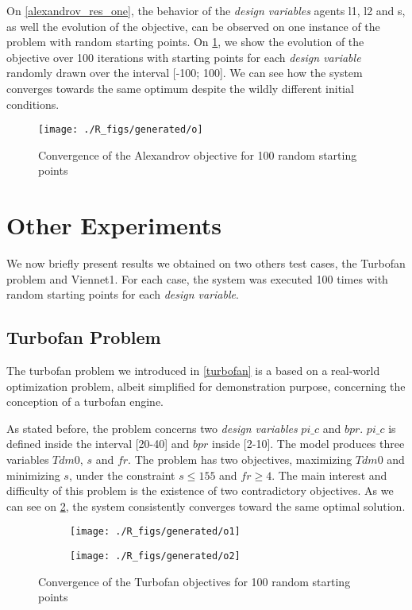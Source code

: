 On \figurename \ref{alexandrov_res_one}, the behavior of the \emph{design variables} agents l1, l2 and s, as well the evolution of the objective, can be observed on one instance of the problem with random starting points. On \figurename \ref{alexandrov_res}, we show the evolution of the objective over 100 iterations with  starting points  for each \emph{design variable} randomly drawn over the interval [-100; 100]. We can see how the system converges towards the same optimum despite the wildly different initial conditions.

\begin{figure}
\centering
    \texttt{[image: ./R\_figs/generated/o]}
	\caption{Convergence of the Alexandrov objective for 100 random starting points}
	\label{alexandrov_res}
\end{figure}

\section{Other Experiments}

We now briefly present results we obtained on two others test cases, the Turbofan problem and Viennet1. For each case, the system was executed 100 times with random starting points for each \emph{design variable}.

\subsection{Turbofan Problem}

The turbofan problem we introduced in \figurename \ref{turbofan} is a based on a real-world optimization problem, albeit simplified for demonstration purpose, concerning the conception of a turbofan engine.

As stated before, the problem concerns two \emph{design variables} $pi\_c$ and $bpr$. $pi\_c$ is defined inside the interval [20-40] and $bpr$ inside [2-10]. The model produces three variables $Tdm0$, $s$ and $fr$.
The problem has two objectives, maximizing  $Tdm0$ and minimizing $s$, under the constraint \(s \leq 155\) and \(fr \geq 4\).
The main interest and difficulty of this problem is the existence of two contradictory objectives.
As we can see on \figurename \ref{snecma_res}, the system consistently converges toward the same optimal solution.

\begin{figure}[h]
	\begin{subfigure}[b]{0.49\textwidth}
		\centering
		\texttt{[image: ./R\_figs/generated/o1]}	
	\end{subfigure}
	\hfill%
	\begin{subfigure}[b]{0.49\textwidth}
		\centering
		\texttt{[image: ./R\_figs/generated/o2]}	
	\end{subfigure}
	\caption{Convergence of the Turbofan objectives for 100 random starting points}
	\label{snecma_res}
\end{figure}

